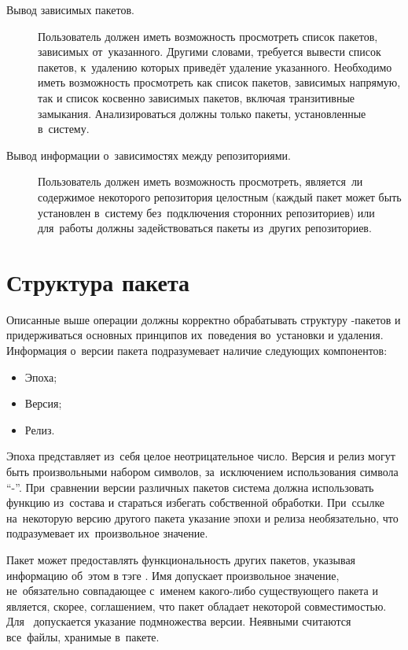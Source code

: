 \begin{description}
\item[Вывод зависимых пакетов.]
Пользователь должен иметь возможность просмотреть список пакетов, зависимых от~указанного.
Другими словами, требуется вывести список пакетов, к~удалению которых приведёт удаление указанного.
Необходимо иметь возможность просмотреть как список пакетов, зависимых напрямую, 
так и список косвенно зависимых пакетов, включая транзитивные замыкания.
Анализироваться должны только пакеты, установленные в~систему.

\item[Вывод информации о~зависимостях между репозиториями.]
Пользователь должен иметь возможность просмотреть, 
является~ли содержимое некоторого репозитория целостным (каждый пакет может быть установлен в~систему без~подключения сторонних репозиториев)
или для~работы должны задействоваться пакеты из~других репозиториев. 

\end{description}

\section{Структура пакета}
\label{pkgstruct}

Описанные выше операции должны корректно обрабатывать структуру -пакетов и 
придерживаться основных принципов их~поведения во~установки и удаления.
Информация о~версии пакета подразумевает наличие следующих компонентов:

\begin{itemize}
\item {Эпоха;}
\item{Версия;}
\item {Релиз.}
\end{itemize}

Эпоха представляет из~себя целое неотрицательное число. 
Версия и релиз могут быть произвольными набором символов, за~исключением использования символа ``-''.
При~сравнении версии различных пакетов система должна использовать функцию  из~состава 
и стараться избегать собственной обработки. 
При~ссылке на~некоторую версию другого пакета указание эпохи и релиза необязательно,
что подразумевает их~произвольное значение.

Пакет может предоставлять функциональность других пакетов,
указывая информацию об~этом в тэге .
Имя  допускает произвольное значение, не~обязательно совпадающее с~именем какого-либо существующего пакета
и является, скорее, соглашением, что пакет обладает некоторой совместимостью.
Для~  допускается указание подмножества версии.
Неявными  считаются все~файлы, хранимые в~пакете.

